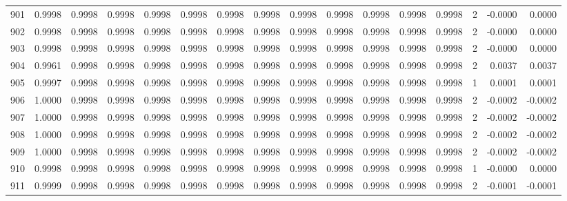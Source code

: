 \begin{tabular}{lrrrrrrrrrrrrrrr}
901 &      0.9998 &  0.9998 &  0.9998 &  0.9998 &  0.9998 &  0.9998 &  0.9998 &  0.9998 &  0.9998 &  0.9998 &   0.9998 &     0.9998 &      2 &                   -0.0000 &                     0.0000 \\
902 &      0.9998 &  0.9998 &  0.9998 &  0.9998 &  0.9998 &  0.9998 &  0.9998 &  0.9998 &  0.9998 &  0.9998 &   0.9998 &     0.9998 &      2 &                   -0.0000 &                     0.0000 \\
903 &      0.9998 &  0.9998 &  0.9998 &  0.9998 &  0.9998 &  0.9998 &  0.9998 &  0.9998 &  0.9998 &  0.9998 &   0.9998 &     0.9998 &      2 &                   -0.0000 &                     0.0000 \\
904 &      0.9961 &  0.9998 &  0.9998 &  0.9998 &  0.9998 &  0.9998 &  0.9998 &  0.9998 &  0.9998 &  0.9998 &   0.9998 &     0.9998 &      2 &                    0.0037 &                     0.0037 \\
905 &      0.9997 &  0.9998 &  0.9998 &  0.9998 &  0.9998 &  0.9998 &  0.9998 &  0.9998 &  0.9998 &  0.9998 &   0.9998 &     0.9998 &      1 &                    0.0001 &                     0.0001 \\
906 &      1.0000 &  0.9998 &  0.9998 &  0.9998 &  0.9998 &  0.9998 &  0.9998 &  0.9998 &  0.9998 &  0.9998 &   0.9998 &     0.9998 &      2 &                   -0.0002 &                    -0.0002 \\
907 &      1.0000 &  0.9998 &  0.9998 &  0.9998 &  0.9998 &  0.9998 &  0.9998 &  0.9998 &  0.9998 &  0.9998 &   0.9998 &     0.9998 &      2 &                   -0.0002 &                    -0.0002 \\
908 &      1.0000 &  0.9998 &  0.9998 &  0.9998 &  0.9998 &  0.9998 &  0.9998 &  0.9998 &  0.9998 &  0.9998 &   0.9998 &     0.9998 &      2 &                   -0.0002 &                    -0.0002 \\
909 &      1.0000 &  0.9998 &  0.9998 &  0.9998 &  0.9998 &  0.9998 &  0.9998 &  0.9998 &  0.9998 &  0.9998 &   0.9998 &     0.9998 &      2 &                   -0.0002 &                    -0.0002 \\
910 &      0.9998 &  0.9998 &  0.9998 &  0.9998 &  0.9998 &  0.9998 &  0.9998 &  0.9998 &  0.9998 &  0.9998 &   0.9998 &     0.9998 &      1 &                   -0.0000 &                     0.0000 \\
911 &      0.9999 &  0.9998 &  0.9998 &  0.9998 &  0.9998 &  0.9998 &  0.9998 &  0.9998 &  0.9998 &  0.9998 &   0.9998 &     0.9998 &      2 &                   -0.0001 &                    -0.0001 \\

\end{tabular}
